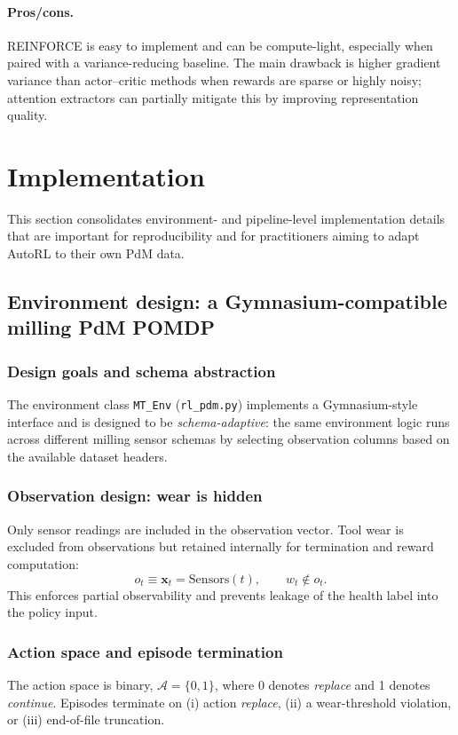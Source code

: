 \documentclass[11pt]{article}
\begin{document}
\paragraph{Pros/cons.}
REINFORCE is easy to implement and can be compute-light, especially when paired with a variance-reducing baseline. The main drawback is higher gradient variance than actor--critic methods when rewards are sparse or highly noisy; attention extractors can partially mitigate this by improving representation quality.

\section{Implementation}
\label{sec:implementation}
This section consolidates environment- and pipeline-level implementation details that are important for reproducibility and for practitioners aiming to adapt AutoRL to their own PdM data.

\subsection{Environment design: a Gymnasium-compatible milling PdM POMDP}
\label{sec:env_design}
\subsubsection{Design goals and schema abstraction}
The environment class \texttt{MT\_Env} (\texttt{rl\_pdm.py}) implements a Gymnasium-style interface and is designed to be \emph{schema-adaptive}: the same environment logic runs across different milling sensor schemas by selecting observation columns based on the available dataset headers.

\subsubsection{Observation design: wear is hidden}
Only sensor readings are included in the observation vector. Tool wear is excluded from observations but retained internally for termination and reward computation:
\begin{equation}
  o_t \equiv \mathbf{x}_t = \mathrm{Sensors}(t),\qquad w_t\notin o_t.
\end{equation}
This enforces partial observability and prevents leakage of the health label into the policy input.

\subsubsection{Action space and episode termination}
The action space is binary, $\mathcal{A}=\{0,1\}$, where 0 denotes \emph{replace} and 1 denotes \emph{continue}. Episodes terminate on (i) action \emph{replace}, (ii) a wear-threshold violation, or (iii) end-of-file truncation.
\end{document}
